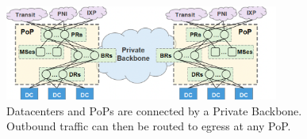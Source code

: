 \section{{\sys}}

\begin{figure}
	\centering
	\includegraphics[width = 9cm]{figs/bg.png}
	\caption{\small Datacenters and PoPs are connected by a Private Backbone. Outbound traffic can then be routed to egress at any PoP.}
	\label{fig:bg}
\end{figure}

